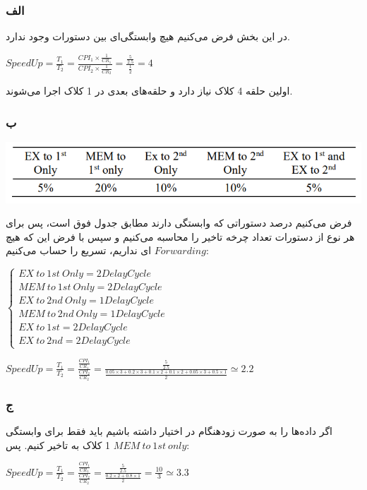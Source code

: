 \subsubsection*{الف}
در این بخش فرض می‌کنیم هیچ وابستگی‌ای بین دستورات وجود ندارد.

\setLTR
$
SpeedUp = \frac{T_1}{T_2} = \frac{CPI_1\times\frac{1}{CR_1}}{CPI_2\times\frac{1}{CR_2}} = \frac{\frac{5}{2.5}}{\frac{1}{2}} = 4
$
\setRTL

اولین حلقه 4 کلاک نیاز دارد و حلقه‌های بعدی در 1 کلاک اجرا می‌شوند.

\subsubsection*{ب}

\setLTR
\qquad \qquad \qquad \qquad \qquad \includegraphics[width=0.5\linewidth]{figs/screenshot001}
\setRTL

فرض می‌کنیم درصد دستوراتی که وابستگی دارند مطابق جدول فوق است، پس برای هر نوع از دستورات تعداد چرخه تاخیر را محاسبه می‌کنیم	و سپس با فرض این که هیچ
$Forwarding$
ای نداریم، تسریع را حساب می‌کنیم:

\setLTR
$
\begin{cases}
	EX \ to \ 1st \ Only = 2 Delay Cycle \\
	MEM \ to \ 1st \ Only =2 Delay Cycle \\
	EX \ to \ 2nd \ Only = 1 Delay Cycle\\ 
	MEM \ to \ 2nd \ Only =1 Delay Cycle\\
	EX \ to \ 1st = 2 Delay Cycle\\
	EX \ to \ 2nd =  2 Delay Cycle
	\end{cases}
$

$
SpeedUp = \frac{T_1}{T_2} = \frac{\frac{CPI_1}{CR_1}}{\frac{CPI_2}{CR_2}} =
 \frac{\frac{5}{2.5}}{
\frac{0.05\times3 + 0.2\times3+0.1\times2+0.1\times2+0.05\times3+ 0.5\times1}{2}
} \simeq 2.2
$
\setRTL


\subsubsection*{ج}

اگر داده‌ها را به صورت زودهنگام در اختیار داشته باشیم باید فقط برای وابستگی 
$MEM \ to \ 1st \ only$
1 کلاک به تاخیر کنیم. پس:

\setLTR
$
SpeedUp = \frac{T_1}{T_2} = \frac{\frac{CPI_1}{CR_1}}{\frac{CPI_2}{CR_2}} = \frac{\frac{5}{2.5}}{\frac{0.2\times2 + 0.8\times1}{2}} = \frac{10}{3} 
\simeq 3.3
$
\setRTL

